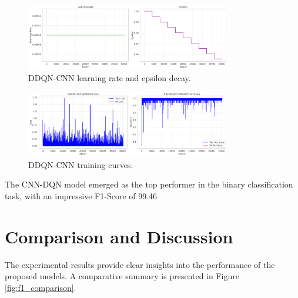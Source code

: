 \documentclass[12pt]{report}
\begin{document}
\vspace{0.5cm}

\begin{figure}[htbp]
    \centering
    \includegraphics[width=0.8\textwidth]{images/double_dqn_cnn_lr_epsilon.png}
    \caption{DDQN-CNN learning rate and epsilon decay.}
    \label{fig:ddqn_cnn_lr_epsilon_cnn}
\end{figure}

\vspace{0.5cm}

\begin{figure}[htbp]
    \centering
    \includegraphics[width=0.8\textwidth]{images/double_dqn_cnn_training_curves.png}
    \caption{DDQN-CNN training curves.}
    \label{fig:ddqn_cnn_training_curves}
\end{figure}

The CNN-DQN model emerged as the top performer in the binary classification task, with an impressive F1-Score of 99.46

\newpage

\section{Comparison and Discussion}
The experimental results provide clear insights into the performance of the proposed models. A comparative summary is presented in Figure \ref{fig:f1_comparison}.
\end{document}
